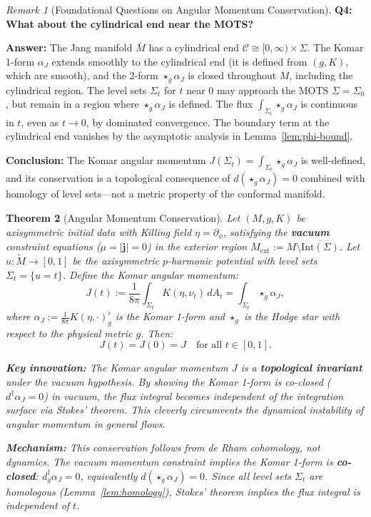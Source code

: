 \documentclass[12pt]{article}
\theoremstyle{plain}
\newtheorem{theorem}{Theorem}[section]
\theoremstyle{definition}
\theoremstyle{remark}
\newtheorem{remark}[theorem]{Remark}
\newcommand{\tM}{\tilde{M}}
\newcommand{\momdens}{\boldsymbol{j}}
\begin{document}
\begin{remark}[Foundational Questions on Angular Momentum Conservation]
\textbf{Q4: What about the cylindrical end near the MOTS?}

\textbf{Answer:} The Jang manifold $\bar{M}$ has a cylindrical end $\mathcal{C} \cong [0, \infty) \times \Sigma$. The Komar 1-form $\alpha_J$ extends smoothly to the cylindrical end (it is defined from $(g, K)$, which are smooth), and the 2-form $\star_g \alpha_J$ is closed throughout $M$, including the cylindrical region. The level sets $\Sigma_t$ for $t$ near 0 may approach the MOTS $\Sigma = \Sigma_0$, but remain in a region where $\star_g \alpha_J$ is defined. The flux $\int_{\Sigma_t} \star_g \alpha_J$ is continuous in $t$, even as $t \to 0$, by dominated convergence. The boundary term at the cylindrical end vanishes by the asymptotic analysis in Lemma~\ref{lem:phi-bound}.

\textbf{Conclusion:} The Komar angular momentum $J(\Sigma_t) = \int_{\Sigma_t} \star_g \alpha_J$ is well-defined, and its conservation is a topological consequence of $d(\star_g \alpha_J) = 0$ combined with homology of level sets---not a metric property of the conformal manifold.
\end{remark}

\begin{theorem}[Angular Momentum Conservation]\label{thm:J-conserve}
Let $(M, g, K)$ be axisymmetric initial data with Killing field $\eta = \partial_\phi$, satisfying the \textbf{vacuum} constraint equations ($\mu = |\momdens| = 0$) in the exterior region $M_{\mathrm{ext}} := M \setminus \overline{\mathrm{Int}(\Sigma)}$. Let $u: \tM \to [0,1]$ be the axisymmetric $p$-harmonic potential with level sets $\Sigma_t = \{u = t\}$. Define the Komar angular momentum:
\[
J(t) := \frac{1}{8\pi}\int_{\Sigma_t} K(\eta, \nu_t) \, dA_t = \int_{\Sigma_t} \star_g \alpha_J,
\]
where $\alpha_J := \frac{1}{8\pi}K(\eta, \cdot)^\flat_g$ is the Komar 1-form and $\star_g$ is the Hodge star with respect to the physical metric $g$. Then:
\[
J(t) = J(0) = J \quad \text{for all } t \in [0, 1].
\]

\textbf{Key innovation:} The Komar angular momentum $J$ is a \textbf{topological invariant} under the vacuum hypothesis. By showing the Komar 1-form is co-closed ($d^\dagger\alpha_J = 0$) in vacuum, the flux integral becomes independent of the integration surface via Stokes' theorem. This cleverly circumvents the dynamical instability of angular momentum in general flows.

\textbf{Mechanism:} This conservation follows from de Rham cohomology, not dynamics. The vacuum momentum constraint implies the Komar 1-form is \textbf{co-closed}: $d^\dagger_g \alpha_J = 0$, equivalently $d(\star_g \alpha_J) = 0$. Since all level sets $\Sigma_t$ are homologous (Lemma~\ref{lem:homology}), Stokes' theorem implies the flux integral is independent of $t$.
\end{theorem}
\end{document}
